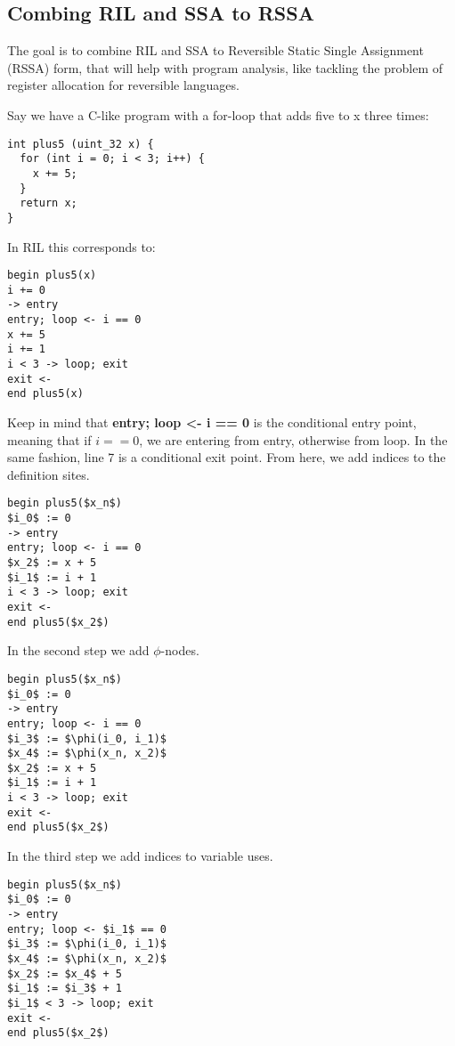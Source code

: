 \subsection{Combing RIL and SSA to RSSA}
The goal is to combine RIL and SSA to Reversible Static Single Assignment (RSSA) form, that will help with program analysis, like tackling the problem of register allocation for reversible languages.

Say we have a C-like program with a for-loop that adds five to x three times:
\begin{lstlisting}
int plus5 (uint_32 x) {
  for (int i = 0; i < 3; i++) {
    x += 5;
  }
  return x;
}
\end{lstlisting}
In RIL this corresponds to:
\begin{lstlisting}[mathescape=true]
begin plus5(x)
i += 0
-> entry
entry; loop <- i == 0
x += 5
i += 1
i < 3 -> loop; exit
exit <-
end plus5(x)
\end{lstlisting}
Keep in mind that \textbf{entry; loop <- i == 0} is the conditional entry point, meaning that if $i == 0$, we are entering from entry, otherwise from loop. In the same fashion, line 7 is a conditional exit point.
From here, we add indices to the definition sites.
\begin{lstlisting}[mathescape=true]
begin plus5($x_n$)
$i_0$ := 0
-> entry
entry; loop <- i == 0
$x_2$ := x + 5
$i_1$ := i + 1
i < 3 -> loop; exit
exit <-
end plus5($x_2$)
\end{lstlisting}
In the second step we add $\phi$-nodes.
\begin{lstlisting}[mathescape=true]
begin plus5($x_n$)
$i_0$ := 0
-> entry
entry; loop <- i == 0
$i_3$ := $\phi(i_0, i_1)$
$x_4$ := $\phi(x_n, x_2)$
$x_2$ := x + 5
$i_1$ := i + 1
i < 3 -> loop; exit
exit <-
end plus5($x_2$)
\end{lstlisting}
In the third step we add indices to variable uses.
\begin{lstlisting}[mathescape=true]
begin plus5($x_n$)
$i_0$ := 0
-> entry
entry; loop <- $i_1$ == 0
$i_3$ := $\phi(i_0, i_1)$
$x_4$ := $\phi(x_n, x_2)$
$x_2$ := $x_4$ + 5
$i_1$ := $i_3$ + 1
$i_1$ < 3 -> loop; exit
exit <-
end plus5($x_2$)
\end{lstlisting}
